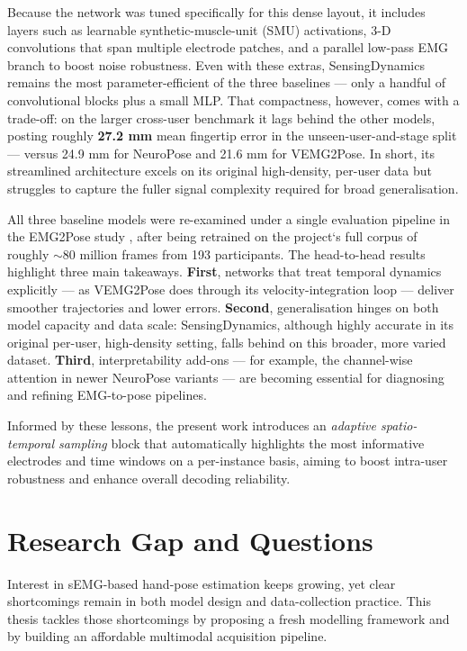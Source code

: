 Because the network was tuned specifically for this dense layout, it includes layers such as learnable synthetic-muscle-unit (SMU) activations, 3-D convolutions that span multiple electrode patches, and a parallel low-pass EMG branch to boost noise robustness. Even with these extras, SensingDynamics remains the most parameter-efficient of the three baselines — only a handful of convolutional blocks plus a small MLP. That compactness, however, comes with a trade-off: on the larger cross-user benchmark it lags behind the other models, posting roughly \textbf{27.2 mm} mean fingertip error in the unseen-user-and-stage split — versus 24.9 mm for NeuroPose and 21.6 mm for VEMG2Pose. In short, its streamlined architecture excels on its original high-density, per-user data but struggles to capture the fuller signal complexity required for broad generalisation.

All three baseline models were re-examined under a single evaluation pipeline in the EMG2Pose study \cite{salter2024emg2pose}, after being retrained on the project`s full corpus of roughly \(\sim\!80\) million frames from 193 participants. The head-to-head results highlight three main takeaways.  
\textbf{First}, networks that treat temporal dynamics explicitly — as VEMG2Pose does through its velocity-integration loop — deliver smoother trajectories and lower errors.  
\textbf{Second}, generalisation hinges on both model capacity and data scale: SensingDynamics, although highly accurate in its original per-user, high-density setting, falls behind on this broader, more varied dataset.  
\textbf{Third}, interpretability add-ons — for example, the channel-wise attention in newer NeuroPose variants — are becoming essential for diagnosing and refining EMG-to-pose pipelines.  

Informed by these lessons, the present work introduces an \emph{adaptive spatio-temporal sampling} block that automatically highlights the most informative electrodes and time windows on a per-instance basis, aiming to boost intra-user robustness and enhance overall decoding reliability.

\section{Research Gap and Questions}

Interest in sEMG-based hand-pose estimation keeps growing, yet clear shortcomings remain in both model design and data-collection practice. This thesis tackles those shortcomings by proposing a fresh modelling framework and by building an affordable multimodal acquisition pipeline.


